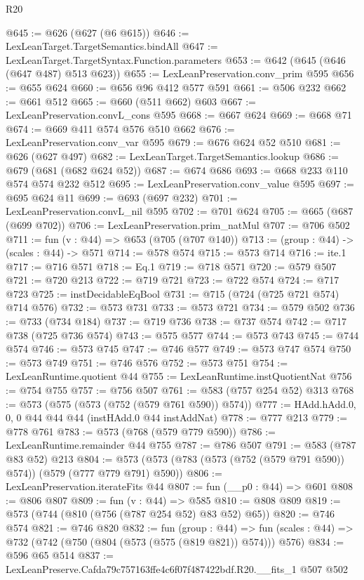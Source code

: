 \begin{lexlean}{R20}
\begin{coremodule}
@645 := @626 (@627 (@6 @615))
@646 := LexLeanTarget.TargetSemantics.bindAll
@647 := LexLeanTarget.TargetSyntax.Function.parameters
@653 := @642 (@645 (@646 (@647 @487) @513 @623))
@655 := LexLeanPreservation.conv_prim @595
@656 := @655 @624
@660 := @656 @96 @412 @577 @591
@661 := @506 @232
@662 := @661 @512
@665 := @660 (@511 @662) @603
@667 := LexLeanPreservation.convL_cons @595
@668 := @667 @624
@669 := @668 @71
@674 := @669 @411 @574 @576 @510 @662
@676 := LexLeanPreservation.conv_var @595
@679 := @676 @624 @52 @510
@681 := @626 (@627 @497)
@682 := LexLeanTarget.TargetSemantics.lookup
@686 := @679 (@681 (@682 @624 @52))
@687 := @674 @686
@693 := @668 @233 @110 @574 @574 @232 @512
@695 := LexLeanPreservation.conv_value @595
@697 := @695 @624 @11
@699 := @693 (@697 @232)
@701 := LexLeanPreservation.convL_nil @595
@702 := @701 @624
@705 := @665 (@687 (@699 @702))
@706 := LexLeanPreservation.prim_natMul
@707 := @706 @502
@711 := fun (v : @44) => @653 (@705 (@707 @140))
@713 := (group : @44) -> (scales : @44) -> @571
@714 := @578 @574
@715 := @573 @714
@716 := ite.{1}
@717 := @716 @571
@718 := Eq.{1}
@719 := @718 @571
@720 := @579 @507
@721 := @720 @213
@722 := @719 @721
@723 := @722 @574
@724 := @717 @723
@725 := instDecidableEqBool
@731 := @715 (@724 (@725 @721 @574) @714 @576)
@732 := @573 @731
@733 := @573 @721
@734 := @579 @502
@736 := @733 (@734 @184)
@737 := @719 @736
@738 := @737 @574
@742 := @717 @738 (@725 @736 @574)
@743 := @575 @577
@744 := @573 @743
@745 := @744 @574
@746 := @573 @745
@747 := @746 @577
@749 := @573 @747 @574
@750 := @573 @749
@751 := @746 @576
@752 := @573 @751
@754 := LexLeanRuntime.quotient @44
@755 := LexLeanRuntime.instQuotientNat
@756 := @754 @755
@757 := @756 @507
@761 := @583 (@757 @254 @52) @313
@768 := @573 (@575 (@573 (@752 (@579 @761 @590)) @574))
@777 := HAdd.hAdd.{0, 0, 0} @44 @44 @44 (instHAdd.{0} @44 instAddNat)
@778 := @777 @213
@779 := @778 @761
@783 := @573 (@768 (@579 @779 @590))
@786 := LexLeanRuntime.remainder @44 @755
@787 := @786 @507
@791 := @583 (@787 @83 @52) @213
@804 := @573 (@573 (@783 (@573 (@752 (@579 @791 @590)) @574)) (@579 (@777 @779 @791) @590))
@806 := LexLeanPreservation.iterateFits @44
@807 := fun (__p0 : @44) => @601
@808 := @806 @807
@809 := fun (v : @44) => @585
@810 := @808 @809
@819 := @573 (@744 (@810 (@756 (@787 @254 @52) @83 @52) @65))
@820 := @746 @574
@821 := @746 @820
@832 := fun (group : @44) =>
  fun (scales : @44) => @732 (@742 (@750 (@804 (@573 (@575 (@819 @821)) @574))) @576)
@834 := @596 @65 @514
@837 := LexLeanPreserve.Cafda79c757163ffe4c6f07f487422bdf.R20.__fits_1 @507 @502

\end{coremodule}
\end{lexlean}
